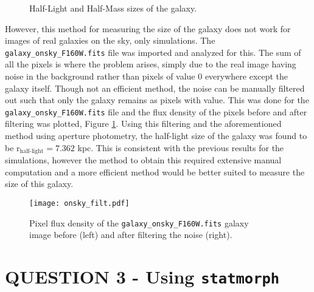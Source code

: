 \documentclass[10pt, preprint]{aastex}
\begin{document}
\begin{figure}[H]
    \centering
    \caption{Half-Light and Half-Mass sizes of the galaxy.}
\end{figure}

\vspace{-1.2\baselineskip}

However, this method for measuring the size of the galaxy does not work for images of real galaxies on the sky, only simulations. The \texttt{galaxy\_onsky\_F160W.fits} file was imported and analyzed for this. The sum of all the pixels is where the problem arises, simply due to the real image having noise in the background rather than pixels of value 0 everywhere except the galaxy itself. Though not an efficient method, the noise can be manually filtered out such that only the galaxy remains as pixels with value. This was done for the \texttt{galaxy\_onsky\_F160W.fits} file and the flux density of the pixels before and after filtering was plotted, Figure \ref{fig:filtered}. Using this filtering and the aforementioned method using aperture photometry, the half-light size of the galaxy was found to be r$_{\textrm{half-light}} = 7.362$ kpc. This is consistent with the previous results for the simulations, however the method to obtain this required extensive manual computation and a more efficient method would be better suited to measure the size of this galaxy.
\vspace{-0.5\baselineskip}

\begin{figure}[H]
    \centering
    \texttt{[image: onsky\_filt.pdf]}
    \caption{\centering Pixel flux density of the \texttt{galaxy\_onsky\_F160W.fits} galaxy \\ image before (left) and after filtering the noise (right).}
    \label{fig:filtered}
\end{figure}
\vspace{-2\baselineskip}

\section*{\large\textbf{QUESTION 3 - Using \texttt{statmorph}}}\label{sec:3}
\end{document}
